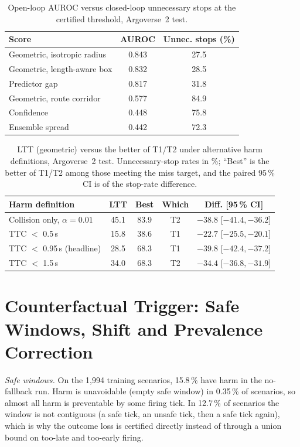 \documentclass[lettersize,journal]{IEEEtran}
\begin{document}
\begin{table}[h]
\caption{Open-loop AUROC versus closed-loop unnecessary stops at the
certified threshold, Argoverse~2 test.}
\label{tab:h1}
\centering
\footnotesize
\begin{tabular}{lcc}
\toprule
Score & AUROC & Unnec. stops (\%) \\
\midrule
Geometric, isotropic radius & 0.843 & 27.5 \\
Geometric, length-aware box & 0.832 & 28.5 \\
Predictor gap & 0.817 & 31.8 \\
Geometric, route corridor & 0.577 & 84.9 \\
Confidence & 0.448 & 75.8 \\
Ensemble spread & 0.442 & 72.3 \\
\bottomrule
\end{tabular}
\end{table}

\begin{table}[h]
\caption{LTT (geometric) versus the better of T1/T2 under alternative
harm definitions, Argoverse~2 test. Unnecessary-stop rates in \%;
``Best'' is the better of T1/T2 among those meeting the miss target, and
the paired 95\,\% CI is of the stop-rate difference.}
\label{tab:align}
\centering
\scriptsize\setlength{\tabcolsep}{2pt}
\begin{tabular}{lcccc}
\toprule
Harm definition & LTT & Best & Which & Diff. [95\,\% CI] \\
\midrule
Collision only, $\alpha{=}0.01$ & 45.1 & 83.9 & T2 & $-38.8$ [$-41.4,-36.2$] \\
TTC $<$ 0.5\,s & 15.8 & 38.6 & T1 & $-22.7$ [$-25.5,-20.1$] \\
TTC $<$ 0.95\,s (headline) & 28.5 & 68.3 & T1 & $-39.8$ [$-42.4,-37.2$] \\
TTC $<$ 1.5\,s & 34.0 & 68.3 & T2 & $-34.4$ [$-36.8,-31.9$] \\
\bottomrule
\end{tabular}
\end{table}

\section{Counterfactual Trigger: Safe Windows, Shift and Prevalence Correction}
\label{sec:s-cswc}
\emph{Safe windows.} On the 1{,}994 training scenarios, 15.8\,\% have harm in the
no-fallback run. Harm is unavoidable (empty safe window) in 0.35\,\% of
scenarios, so almost all harm is preventable by some firing tick. In
12.7\,\% of scenarios the window is not contiguous (a safe tick, an unsafe
tick, then a safe tick again), which is why the outcome loss is certified
directly instead of through a union bound on too-late and too-early
firing.
\end{document}
